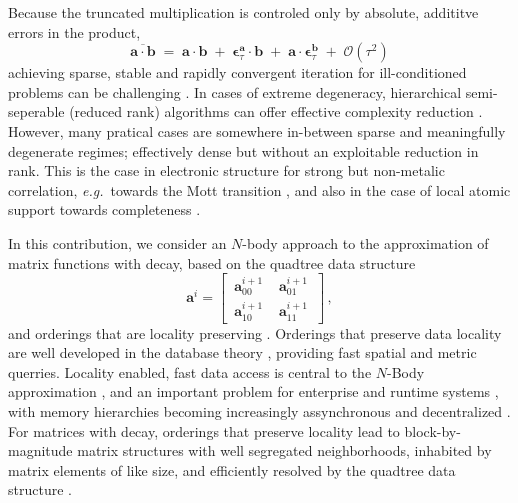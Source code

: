 \documentclass[letterpaper,twocolumn,amsmath,amsfont,amssymb,english,aps,jcp,preprintnumbers,groupaddress,nofootinbib,tightenlines]{revtex4}
\newcommand{\mat}[1]{\boldsymbol{#1}}
\begin{document}
Because the truncated multiplication is controled only by absolute, addititve errors in the  product,   
\begin{equation} \label{sparseapprox}
\overline{ \mat{a} \cdot \mat{b} }\; = \; \mat{a}\cdot\mat{b} \; +\; \mat{\epsilon}^{\mat{a}}_\tau \cdot \mat{b} \;+\;
 \mat{a} \cdot \mat{\epsilon}^{\mat{b}}_\tau  \; + \;   {\mathcal O}(\tau^2)
\end{equation}
achieving sparse, stable and rapidly convergent iteration for ill-conditioned problems can be challenging \cite{}.  In cases of 
extreme degeneracy,  hierarchical semi-seperable (reduced rank) algorithms  can offer effective complexity reduction \cite{}.
However, many pratical cases are somewhere in-between sparse and meaningfully degenerate regimes; effectively dense but without
an exploitable reduction in rank.  This is the case in electronic structure for strong but non-metalic correlation, 
{\em e.g.}~towards the Mott transition \cite{}, and also in the case of local atomic support towards completeness \cite{Others, Hutter, Gigi}. 

\pagebreak
In this contribution, we consider an $N$-body approach to the approximation of matrix functions with decay, 
based on the quadtree data structure \cite{wise, samet} 
\begin{equation}
\mat{a}^i = \begin{bmatrix} \,  \mat{a}^{i+1}_{00} \, & \,  \mat{a}^{i+1}_{01} \,  \\[0.2cm]  \, \mat{a}^{i+1}_{10} \,  & \,\mat{a}^{i+1}_{11} \, \end{bmatrix} \, ,
\end{equation}
and orderings that are locality preserving \cite{}.  Orderings that preserve data locality are well developed in the
database theory \cite{}, providing fast spatial and metric querries.  
Locality enabled, fast data access is central to the $N$-Body approximation \cite{}, and an important problem 
for enterprise \cite{} and runtime systems \cite{}, with memory hierarchies becoming increasingly assynchronous and decentralized \cite{cache}.  
For matrices with decay, orderings that preserve locality lead to block-by-magnitude matrix structures with well 
segregated neighborhoods, inhabited by matrix elements of like size, and efficiently resolved by the quadtree data structure \cite{}.
\end{document}
